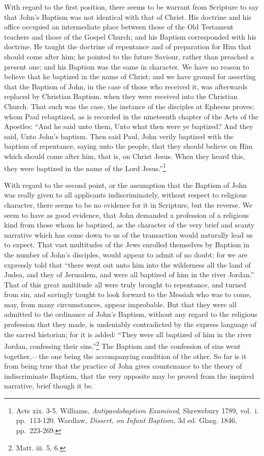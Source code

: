 \documentclass[]{book}
\begin{document}
With regard to the first position, there seems to be warrant from Scripture to say that John's Baptism was not identical with that of Christ. His doctrine and his office occupied an intermediate place between those of the Old Testament teachers and those of the Gospel Church; and his Baptism corresponded with his doctrine. He taught the doctrine of repentance and of preparation for Him that should come after him; he pointed to the future Saviour, rather than preached a present one; and his Baptism was the same in character. We have no reason to believe that he baptized in the name of Christ; and we have ground for asserting that the Baptism of John, in the case of those who received it, was afterwards replaced by Christian Baptism, when they were received into the Christian Church. That such was the case, the instance of the disciples at Ephesus proves; whom Paul rebaptized, as is recorded in the nineteenth chapter of the Acts of the Apostles: ``And he said unto them, Unto what then were ye baptized? And they said, Unto John's baptism. Then said Paul, John verily baptized with the baptism of repentance, saying unto the people, that they should believe on Him which should come after him, that is, on Christ Jesus. When they heard this, they were baptized in the name of the Lord Jesus.''\footnote{Acts xix. 3-5. Williams, \emph{Antipaedobaptism Examined}, Shrewsbury 1789, vol.~i. pp.~113-120. Wardlaw, \emph{Dissert, on Infant Baptism}, 3d ed. Glasg. 1846, pp.~223-269.}

With regard to the second point, or the assumption that the Baptism of John was really given to all applicants indiscriminately, without respect to religious character, there seems to be no evidence for it in Scripture, but the reverse. We seem to have as good evidence, that John demanded a profession of a religious kind from those whom he baptized, as the character of the very brief and scanty narrative which has come down to us of the transaction would naturally lead us to expect. That vast multitudes of the Jews enrolled themselves by Baptism in the number of John's disciples, would appear to admit of no doubt; for we are expressly told that ``there went out unto him into the wilderness all the land of Judea, and they of Jerusalem, and were all baptized of him in the river Jordan.'' That of this great multitude all were truly brought to repentance, and turned from sin, and savingly taught to look forward to the Messiah who was to come, may, from many circumstances, appear improbable. But that they were all admitted to the ordinance of John's Baptism, without any regard to the religious profession that they made, is undeniably contradicted by the express language of the sacred historian; for it is added: ``They were all baptized of him in the river Jordan, confessing their sins.''\footnote{Matt. iii. 5, 6.} The Baptism and the confession of sins went together,---the one being the accompanying condition of the other. So far is it from being true that the practice of John gives countenance to the theory of indiscriminate Baptism, that the very opposite may be proved from the inspired narrative, brief though it be.
\end{document}
